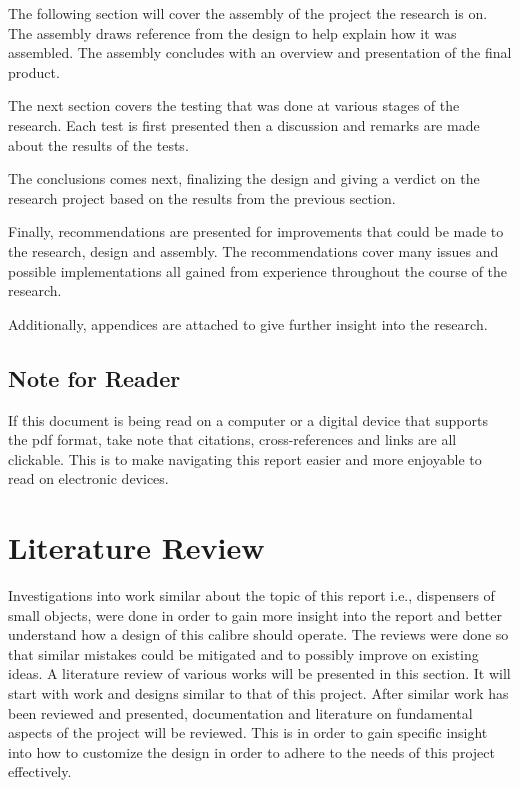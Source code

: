 \documentclass[a4paper,11pt]{article}
\numberwithin{figure}{section}
\numberwithin{table}{section}
\begin{document}
The following section will cover the assembly of the project the research is on. The assembly draws reference from the design to help explain how it was assembled. The assembly concludes with an overview and presentation of the final product.

The next section covers the testing that was done at various stages of the research. Each test is first presented then a discussion and remarks are made about the results of the tests.

The conclusions comes next, finalizing the design and giving a verdict on the research project based on the results from the previous section.

Finally, recommendations are presented for improvements that could be made to the research, design and assembly. The recommendations cover many issues and possible implementations all gained from experience throughout the course of the research.

Additionally, appendices are attached to give further insight into the research.
	\subsection{Note for Reader}
	If this document is being read on a computer or a digital device that supports the pdf format, take note that citations, cross-references and links are all clickable. This is to make navigating this report easier and more enjoyable to read on electronic devices.
	\newpage
\setlength{\parskip}{1em}
\section{Literature Review}\thispagestyle{sectionstart}
Investigations into work similar about the topic of this report i.e., dispensers of small objects, were done in order to gain more insight into the report and better understand how a design of this calibre should operate. The reviews were done so that similar mistakes could be mitigated and to possibly improve on existing ideas. A literature review of various works will be presented in this section. It will start with work and designs similar to that of this project. After similar work has been reviewed and presented, documentation and literature on fundamental aspects of the project will be reviewed. This is in order to gain specific insight into how to customize the design in order to adhere to the needs of this project effectively. 
\end{document}
